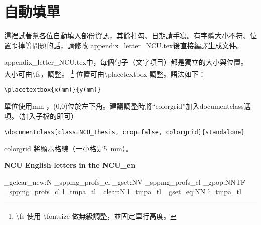 \documentclass[class=NCU_thesis, crop=false]{standalone}
\begin{document}
\chapter{自動填單}
這裡試著幫各位自動填入部份資訊，其餘打勾、日期請手寫。有字體大小不符、位置歪掉等問題的話，請修改 appendix\_letter\_NCU.tex後直接編譯生成文件。

appendix\_letter\_NCU.tex中，每個句子（文字項目）都是獨立的大小與位置。 大小可由\textbackslash{}fs，調整。
\footnote{\textbackslash{}fs 使用 \textbackslash{}fontsize 做無級調整，並固定單行高度。 }
位置可由\textbackslash{}placetextbox 調整。語法如下：
\begin{lstlisting}[style=LatexStyle,caption={}]
\placetextbox{x(mm)}{y(mm)}
\end{lstlisting}
單位使用mm ，(0,0)位於左下角。建議調整時將``colorgrid''加入documentclass選項。（加入子檔的即可）
\begin{lstlisting}[style=LatexStyle,caption={}]
\documentclass[class=NCU_thesis, crop=false, colorgrid]{standalone}
\end{lstlisting}
colorgrid 將顯示格線（一小格是\SI{5}{\milli\metre}）。

\begin{center}
{ \noindent\color{red}\bfseries\Large NCU English letters in the NCU\_en}
\end{center}


\ExplSyntaxOn
    \clist_gclear_new:N \g_sppmg_profs_cl
    \clist_gset:NV \g_sppmg_profs_cl \profs
    \clist_gpop:NNTF \g_sppmg_profs_cl \l_tmpa_tl {}{ \tl_clear:N \l_tmpa_tl}
    \cs_gset_eq:NN \mprof \l_tmpa_tl
\ExplSyntaxOff

\cleardoublepage
\pagestyle{empty}
\sffamily


\end{document}
